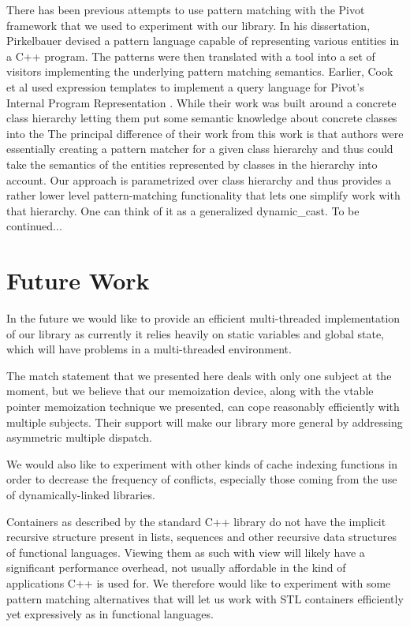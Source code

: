 \documentclass[preprint]{sigplanconf}
\begin{document}

There has been previous attempts to use pattern matching with the Pivot 
framework that we used to experiment with our library. In his dissertation, 
Pirkelbauer devised a pattern language capable of representing various entities 
in a C++ program. The patterns were then translated with a tool into a set of 
visitors implementing the underlying pattern matching 
semantics\cite{PirkelbauerThesis}. Earlier, Cook et al used expression templates 
to implement a query language for Pivot's Internal Program Representation 
\cite{iql04}. While their work was built around a concrete class hierarchy 
letting them put some semantic knowledge about concrete classes into the 
The principal difference of their work from this work is that 
authors were essentially creating a pattern matcher for a given class hierarchy 
and thus could take the semantics of the entities represented by classes in the 
hierarchy into account. Our approach is parametrized over class hierarchy and 
thus provides a rather lower level pattern-matching functionality that lets one 
simplify work with that hierarchy.  One can think of it as a generalized 
dynamic\_cast. To be continued...

\section{Future Work} %
\label{sec:fw}

In the future we would like to provide an efficient multi-threaded 
implementation of our library as currently it relies heavily on static variables 
and global state, which will have problems in a multi-threaded environment. 

The match statement that we presented here deals with only one subject at the 
moment, but we believe that our memoization device, along with the vtable pointer memoization 
technique we presented, can cope reasonably efficiently with multiple subjects. 
Their support will make our library more general by addressing asymmetric 
multiple dispatch.

We would also like to experiment with other kinds of cache indexing functions in 
order to decrease the frequency of conflicts, especially those coming from the use 
of dynamically-linked libraries.

Containers as described by the standard C++ library do not have the implicit 
recursive structure present in lists, sequences and other recursive data 
structures of functional languages. Viewing them as such with view will likely 
have a significant performance overhead, not usually affordable in the kind of 
applications C++ is used for. We therefore would like to experiment with some 
pattern matching alternatives that will let us work with STL containers 
efficiently yet expressively as in functional languages.
\end{document}
